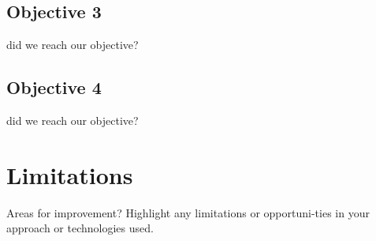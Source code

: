 \subsection{Objective 3}
did we reach our objective?

\subsection{Objective 4}
did we reach our objective?

\section{Limitations}
Areas for improvement?
Highlight any limitations or opportuni-ties in your approach or technologies used.